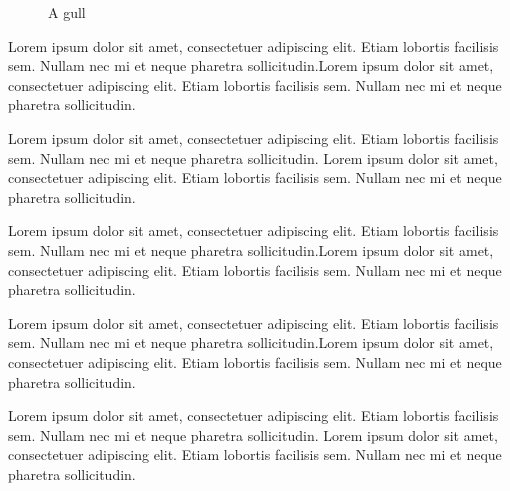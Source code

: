 \documentclass[12pt]{article}
\begin{document}
\begin{figure}
  \begin{center}
  \end{center}
  \caption{A gull}
\end{figure}



Lorem ipsum dolor sit amet, consectetuer adipiscing elit. 
Etiam lobortis facilisis sem. Nullam nec mi et neque pharetra sollicitudin.Lorem ipsum dolor sit amet, consectetuer adipiscing elit. Etiam lobortis facilisis sem. Nullam nec mi et neque pharetra sollicitudin.

Lorem ipsum dolor sit amet, consectetuer adipiscing elit. Etiam lobortis facilisis sem. Nullam nec mi et neque pharetra sollicitudin. Lorem ipsum dolor sit amet, consectetuer adipiscing elit. Etiam lobortis facilisis sem. Nullam nec mi et neque pharetra sollicitudin.

Lorem ipsum dolor sit amet, consectetuer adipiscing elit. Etiam lobortis facilisis sem. Nullam nec mi et neque pharetra sollicitudin.Lorem ipsum dolor sit amet, consectetuer adipiscing elit. Etiam lobortis facilisis sem. Nullam nec mi et neque pharetra sollicitudin.







\newpage


Lorem ipsum dolor sit amet, consectetuer adipiscing elit. 
Etiam lobortis facilisis sem. Nullam nec mi et neque pharetra sollicitudin.Lorem ipsum dolor sit amet, consectetuer adipiscing elit. Etiam lobortis facilisis sem. Nullam nec mi et neque pharetra sollicitudin.

Lorem ipsum dolor sit amet, consectetuer adipiscing elit. Etiam lobortis facilisis sem. Nullam nec mi et neque pharetra sollicitudin. Lorem ipsum dolor sit amet, consectetuer adipiscing elit. Etiam lobortis facilisis sem. Nullam nec mi et neque pharetra sollicitudin.
\end{document}
